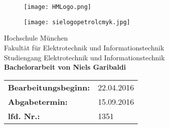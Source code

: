 \begin{titlepage}
	\begin{figure}[h]
		 
		\begin{minipage}{0.45\linewidth} 
			\raggedright 
			\texttt{[image: HMLogo.png]} 
		\end{minipage} 
		\begin{minipage}{0.45\linewidth} 
			\raggedleft
			\vspace*{1 cm} 
			\texttt{[image: sielogopetrolcmyk.jpg]} 
		\end{minipage} 
	\end{figure}
	\begin{center} 
		\vspace{1.5 cm} {\LARGE Hochschule München} \\ 
		\vspace{1 cm} {\LARGE Fakultät für Elektrotechnik und Informationstechnik} \\ 
		\vspace{2 cm} {\Large Studiengang Elektrotechnik und Informationstechnik} \\ 
		\vspace*{2 cm}{\Huge \bf Industrie 4.0 - Pathfinding auf einer SPS\\} 
		\vspace{2 cm}
		{\bf Bachelorarbeit von Niels Garibaldi}\\
	\end{center}
	\vspace{4 cm}
	\begin{center}
		
		\begin{tabular}{ll}
			
			{\bf Bearbeitungsbeginn:} & 22.04.2016\\
			{\bf Abgabetermin:} & 15.09.2016\\
			{\bf lfd. Nr.:} & 1351\\
		\end{tabular}
	\end{center}

\end{titlepage} 


